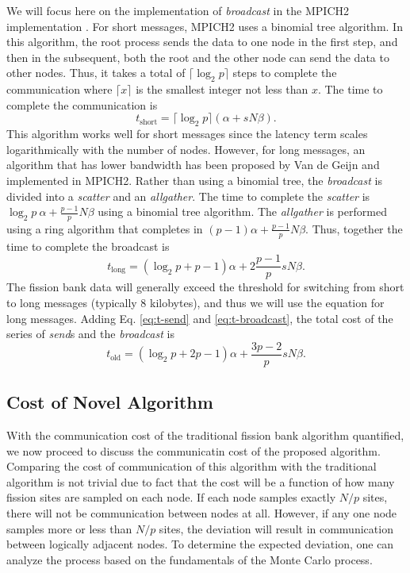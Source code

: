 We will focus here on the implementation of \emph{broadcast} in the
MPICH2 implementation \cite{mpich}. For short messages, MPICH2 uses a
binomial tree algorithm. In this algorithm, the root process sends the
data to one node in the first step, and then in the subsequent, both
the root and the other node can send the data to other nodes. Thus, it
takes a total of $\lceil \log_2 p \rceil$ steps to complete the
communication where $\lceil x \rceil$ is the smallest integer not less
than $x$. The time to complete the communication is
\begin{equation}
  t_{\text{short}} = \lceil \log_2 p \rceil \left ( \alpha + sN\beta
  \right ).
\end{equation}
This algorithm works well for short messages since the latency term
scales logarithmically with the number of nodes. However, for long
messages, an algorithm that has lower bandwidth has been proposed by
Van de Geijn \cite{vandegeijn} and implemented in MPICH2. Rather than
using a binomial tree, the \emph{broadcast} is divided into a
\emph{scatter} and an \emph{allgather}. The time to complete the
\emph{scatter} is $ \log_2 p \: \alpha + \frac{p-1}{p} N\beta$ using a
binomial tree algorithm. The \emph{allgather} is performed using a
ring algorithm that completes in $(p-1) \alpha + \frac{p-1}{p}
N\beta$. Thus, together the time to complete the broadcast is
\begin{equation}\label{eq:t-broadcast}
  t_{\text{long}} = \left ( \log_2 p + p - 1 \right ) \alpha + 2
  \frac{p-1}{p} sN\beta.
\end{equation}
The fission bank data will generally exceed the threshold for
switching from short to long messages (typically 8 kilobytes), and
thus we will use the equation for long messages. Adding
Eq. \ref{eq:t-send} and \ref{eq:t-broadcast}, the total cost of the
series of \emph{send}s and the \emph{broadcast} is
\begin{equation}
  t_{\text{old}} = \left ( \log_2 p + 2p - 1 \right ) \alpha +
  \frac{3p-2}{p} sN\beta.
\end{equation}

\subsection{Cost of Novel Algorithm}

With the communication cost of the traditional fission bank algorithm
quantified, we now proceed to discuss the communicatin cost of the
proposed algorithm. Comparing the cost of communication of this
algorithm with the traditional algorithm is not trivial due to fact
that the cost will be a function of how many fission sites are sampled
on each node. If each node samples exactly $N/p$ sites, there will not
be communication between nodes at all. However, if any one node
samples more or less than $N/p$ sites, the deviation will result in
communication between logically adjacent nodes. To determine the
expected deviation, one can analyze the process based on the
fundamentals of the Monte Carlo process.

